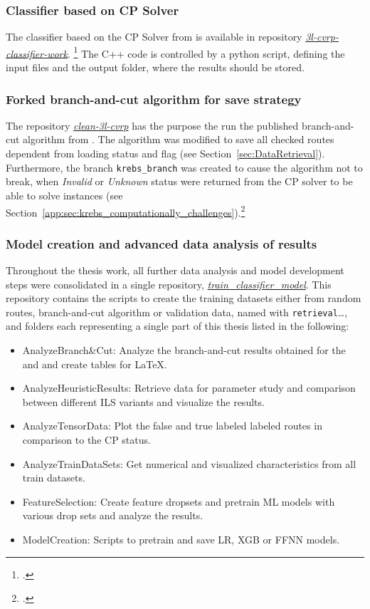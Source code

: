 \subsubsection{Classifier based on CP Solver}
The classifier based on the \gls{CP} Solver from \cite{tamke_repository_2024} is available in
repository \href{https://github.com/MxHbm/3l-cvrp-classifier-work}{\textit{3l-cvrp-classifier-work}}. \footcite{tamke_repository_2024}
The C++ code is controlled by a python script, defining the input files and the output folder, where the results should be stored.

\subsubsection{Forked branch-and-cut algorithm for save strategy}
The  repository \href{https://github.com/MxHbm/clean-3l-cvrp}{\textit{clean-3l-cvrp}} has the purpose the run the published branch-and-cut algorithm from \cite{tamke_branch-and-cut_2024}. The algorithm
was modified to save all checked routes dependent from loading status and flag (see Section~\ref{sec:DataRetrieval}). Furthermore,
the branch \texttt{krebs\_branch} was created to cause the algorithm not to break, when \textit{Invalid} or \textit{Unknown}
status were returned from the \gls{CP} solver to be able to solve \krebsADataSetText instances (see Section~\ref{app:sec:krebs_computationally_challenges}).\footcite[cf.][]{tamke_branch-and-cut_2024}

\subsubsection{Model creation and advanced data analysis of results}

Throughout the thesis work, all further data analysis and model development steps were consolidated in a single repository,
\href{https://github.com/MxHbm/train_classifier_model}{\textit{train\_classifier\_model}}. This repository contains the scripts to
create the training datasets either from random routes, branch-and-cut algorithm or validation data, named with \texttt{retrieval}\dots,
and folders each representing a single part of this thesis listed in the following:
\begin{itemize}
	\item AnalyzeBranch\&Cut: Analyze the branch-and-cut results obtained for the \gendreauDataSetText and \krebsADataSetText and create tables for \LaTeX.
	\item AnalyzeHeuristicResults: Retrieve data for parameter study and comparison between different \gls{ILS} variants and visualize the results.
	\item AnalyzeTensorData: Plot the false and true labeled labeled routes in comparison to the \gls{CP} status.
	\item AnalyzeTrainDataSets: Get numerical and visualized characteristics from all train datasets.
	\item FeatureSelection: Create feature dropsets and pretrain \gls{ML} models with various drop sets and analyze the results.
	\item ModelCreation: Scripts to pretrain and save \gls{LR}, \gls{XGB} or \gls{FFNN} models.
\end{itemize}

